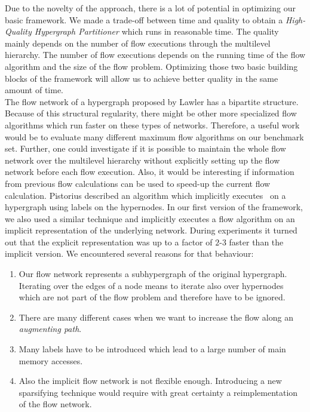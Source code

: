 Due to the novelty of the approach, there is a lot of potential in optimizing our basic 
framework. We made a trade-off between time and quality to obtain a \emph{High-Quality 
Hypergraph Partitioner} which runs in reasonable time. The quality mainly depends
on the number of flow executions through the multilevel hierarchy. The number of flow
executions depends on the running time of the flow algorithm and the size of the flow
problem. Optimizing those two basic building blocks of the framework will allow us to
achieve better quality in the same amount of time.\\
The flow network of a hypergraph proposed by Lawler \cite{lawler1973} has a bipartite 
structure. Because of this structural regularity, there might be other more specialized
flow algorithms which run faster on these types of networks. Therefore, a useful work 
would be to evaluate many different maximum flow algorithms on our benchmark set. Further,
one could investigate if it is possible to maintain the whole flow network over the
multilevel hierarchy without explicitly setting up the flow network before each flow
execution. Also, it would be interesting if information from previous flow calculations can 
be used to speed-up the current flow calculation. Pistorius \cite{pistorius2003} described
an algorithm which implicitly executes \EdmondKarp~on a hypergraph using
labels on the hypernodes. In our first version of the framework, we also used a similar 
technique and implicitly executes a flow algorithm on an implicit representation of 
the underlying network. During experiments it turned out that the explicit representation
was up to a factor of $2$-$3$ faster than the implicit version. We encountered several reasons
for that behaviour:
\begin{enumerate}
\item Our flow network represents a subhypergraph of the original hypergraph. Iterating 
      over the edges of a node means to iterate also over hypernodes which are not part of 
      the flow problem and therefore have to be ignored.
\item There are many different cases when we want to increase the flow along an 
      \emph{augmenting path}.
\item Many labels have to be introduced which lead to a large number of 
      main memory accesses.
\item Also the implicit flow network is not flexible enough. Introducing a new sparsifying
      technique would require with great certainty a reimplementation of the flow network.
\end{enumerate}
